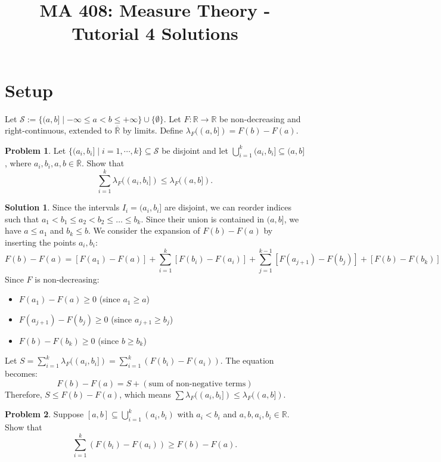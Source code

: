 \documentclass{article}
\title{MA 408: Measure Theory - Tutorial 4 Solutions}
\author{}
\date{}
\theoremstyle{definition}
\newtheorem{problem}{Problem}
\newtheorem*{solution}{Solution}
\begin{document}
\maketitle

\section*{Setup}
Let $\mathcal{S} := \{(a, b] \mid -\infty \le a < b \le +\infty\} \cup \{\emptyset\}$. Let $F: \mathbb{R} \to \mathbb{R}$ be non-decreasing and right-continuous, extended to $\overline{\mathbb{R}}$ by limits. Define $\lambda_F((a, b]) = F(b) - F(a)$.

\hrulefill

\begin{problem}
Let $\{(a_i, b_i] \mid i=1, \cdots, k\} \subseteq \mathcal{S}$ be disjoint and let $\bigcup_{i=1}^k (a_i, b_i] \subseteq (a, b]$, where $a_i, b_i, a, b \in \overline{\mathbb{R}}$. Show that
\[ \sum_{i=1}^k \lambda_F((a_i, b_i]) \le \lambda_F((a, b]). \]
\end{problem}

\begin{solution}
Since the intervals $I_i = (a_i, b_i]$ are disjoint, we can reorder indices such that $a_1 < b_1 \le a_2 < b_2 \le \dots \le b_k$.
Since their union is contained in $(a, b]$, we have $a \le a_1$ and $b_k \le b$.
We consider the expansion of $F(b) - F(a)$ by inserting the points $a_i, b_i$:
\[ F(b) - F(a) = [F(a_1) - F(a)] + \sum_{i=1}^k [F(b_i) - F(a_i)] + \sum_{j=1}^{k-1} [F(a_{j+1}) - F(b_j)] + [F(b) - F(b_k)] \]
Since $F$ is non-decreasing:
\begin{itemize}
    \item $F(a_1) - F(a) \ge 0$ (since $a_1 \ge a$)
    \item $F(a_{j+1}) - F(b_j) \ge 0$ (since $a_{j+1} \ge b_j$)
    \item $F(b) - F(b_k) \ge 0$ (since $b \ge b_k$)
\end{itemize}
Let $S = \sum_{i=1}^k \lambda_F((a_i, b_i]) = \sum_{i=1}^k (F(b_i) - F(a_i))$.
The equation becomes:
\[ F(b) - F(a) = S + (\text{sum of non-negative terms}) \]
Therefore, $S \le F(b) - F(a)$, which means $\sum \lambda_F((a_i, b_i]) \le \lambda_F((a, b])$.
\end{solution}

\hrulefill

\begin{problem}
Suppose $[a, b] \subseteq \bigcup_{i=1}^k (a_i, b_i)$ with $a_i < b_i$ and $a, b, a_i, b_i \in \mathbb{R}$. Show that
\[ \sum_{i=1}^k (F(b_i) - F(a_i)) \ge F(b) - F(a). \]
\end{problem}
\end{document}

